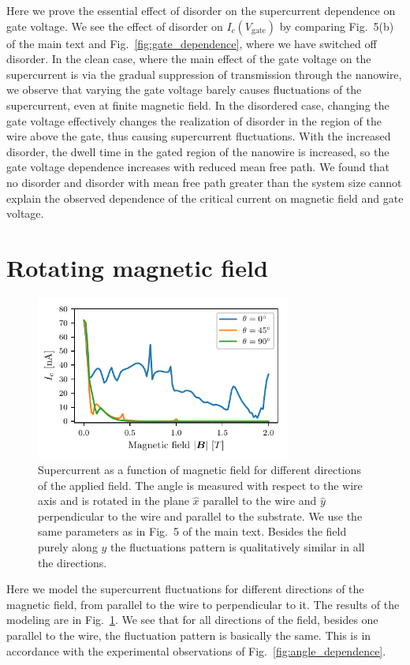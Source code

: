 \documentclass[english, aps,prb,showpacs,preprintnumber,amsmath,amssymb,superscriptaddress,reprint]{revtex4-1}
\begin{document}
Here we prove the essential effect of disorder on the supercurrent dependence on gate voltage.
We see the effect of disorder on $I_c(V_\textrm{gate})$ by comparing Fig.~5(b) of the main text and Fig.~\ref{fig:gate_dependence}, where we have switched off disorder.
In the clean case, where the main effect of the gate voltage on the supercurrent is via the gradual suppression of transmission through the nanowire, we observe that varying the gate voltage barely causes fluctuations of the supercurrent, even at finite magnetic field.
In the disordered case, changing the gate voltage effectively changes the realization of disorder in the region of the wire above the gate, thus causing supercurrent fluctuations. With the increased disorder, the dwell time in the gated region of the nanowire is increased, so the gate voltage dependence increases with reduced mean free path.
We found that no disorder and disorder with mean free path greater than the system size cannot explain the observed dependence of the critical current on magnetic field and gate voltage.

\section{Rotating magnetic field}
\begin{figure}
\centering
\includegraphics[width=0.75\textwidth]{figures/sup_fig10}
\caption{
Supercurrent as a function of magnetic field for different directions of the applied field.
The angle is measured with respect to the wire axis and is rotated in the plane $\hat{x}$ parallel to the wire and $\hat{y}$ perpendicular to the wire and parallel to the substrate.
We use the same parameters as in Fig.~5 of the main text\label{fig:rotation_of_field}.
Besides the field purely along $\hat{y}$ the fluctuations pattern is qualitatively similar in all the directions.}
\end{figure}

Here we model the supercurrent fluctuations for different directions of the magnetic field, from parallel to the wire to perpendicular to it. 
The results of the modeling are in Fig.~\ref{fig:rotation_of_field}.
We see that for all directions of the field, besides one parallel to the wire, the fluctuation pattern is basically the same.
This is in accordance with the experimental observations of Fig.~\ref{fig:angle_dependence}. 


\end{document}
